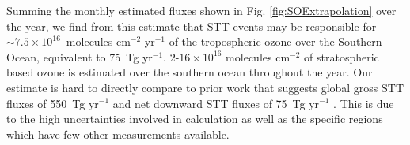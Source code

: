     Summing the monthly estimated fluxes shown in Fig. \ref{fig:SOExtrapolation} over the year, we find from this estimate that STT events may be responsible for $\sim 7.5 \times10^{16}$~molecules cm$^{-2}$ yr$^{-1}$ of the tropospheric ozone over the Southern Ocean, equivalent to 75~Tg yr$^{-1}$.
    $2$-$16 \times 10^{16}$ molecules cm$^{-2}$ of stratospheric based ozone is estimated over the southern ocean throughout the year.
    Our estimate is hard to directly compare to prior work that suggests global gross STT fluxes of 550~Tg yr$^{-1}$ \citep{Stevenson2006} and net downward STT fluxes of 75~Tg yr$^{-1}$ \citep{Sprenger2003}.
    This is due to the high uncertainties involved in calculation as well as the specific regions which have few other measurements available.

% 
%